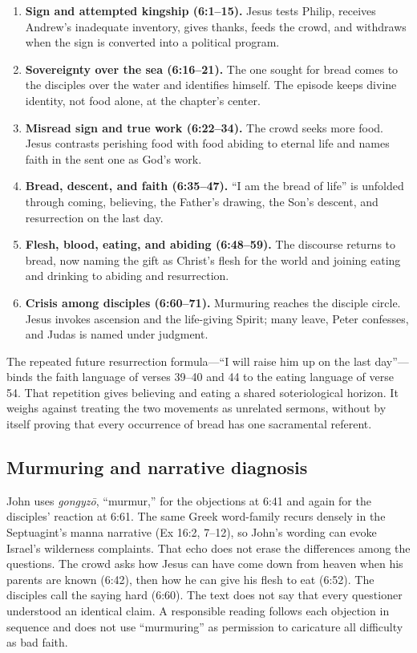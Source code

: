 \begin{enumerate}
\item \textbf{Sign and attempted kingship (6:1--15).} Jesus tests Philip,
receives Andrew's inadequate inventory, gives thanks, feeds the crowd, and
withdraws when the sign is converted into a political program.
\item \textbf{Sovereignty over the sea (6:16--21).} The one sought for bread
comes to the disciples over the water and identifies himself. The episode keeps
divine identity, not food alone, at the chapter's center.
\item \textbf{Misread sign and true work (6:22--34).} The crowd seeks more
food. Jesus contrasts perishing food with food abiding to eternal life and
names faith in the sent one as God's work.
\item \textbf{Bread, descent, and faith (6:35--47).} ``I am the bread of life''
is unfolded through coming, believing, the Father's drawing, the Son's descent,
and resurrection on the last day.
\item \textbf{Flesh, blood, eating, and abiding (6:48--59).} The discourse
returns to bread, now naming the gift as Christ's flesh for the world and
joining eating and drinking to abiding and resurrection.
\item \textbf{Crisis among disciples (6:60--71).} Murmuring reaches the
disciple circle. Jesus invokes ascension and the life-giving Spirit; many leave,
Peter confesses, and Judas is named under judgment.
\end{enumerate}

The repeated future resurrection formula---``I will raise him up on the last
day''---binds the faith language of verses 39--40 and 44 to the eating language
of verse 54. That repetition gives believing and eating a shared soteriological
horizon. It weighs against treating the two movements as unrelated sermons,
without by itself proving that every occurrence of bread has one sacramental
referent.

\subsection{Murmuring and narrative diagnosis}

John uses \emph{gongyz\=o}, ``murmur,'' for the objections at 6:41 and again
for the disciples' reaction at 6:61. The same Greek word-family recurs densely
in the Septuagint's manna narrative (Ex 16:2, 7--12), so John's wording can
evoke Israel's wilderness complaints. That echo does not erase the differences
among the questions. The crowd asks how Jesus can have come down from heaven
when his parents are known (6:42), then how he can give his flesh to eat
(6:52). The disciples call the saying hard (6:60). The text does not say that
every questioner understood an identical claim. A responsible reading follows
each objection in sequence and does not use ``murmuring'' as permission to
caricature all difficulty as bad faith.

